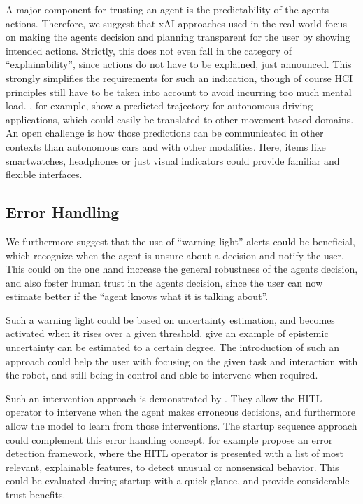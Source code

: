\documentclass[twoside,11pt]{article}
\begin{document}
A major component for trusting an agent is the predictability of the agents actions. Therefore, we suggest that xAI approaches used in the real-world focus on making the agents decision and planning transparent for the user by showing intended actions. Strictly, this does not even fall in the category of ``explainability'', since actions do not have to be explained, just announced. This strongly simplifies the requirements for such an indication, though of course HCI principles still have to be taken into account to avoid incurring too much mental load. \citet{Caltagarione:2017:DrivingPathGeneration}, for example, show a predicted trajectory for autonomous driving applications, which could easily be translated to other movement-based domains. 
An open challenge is how those predictions can be communicated in other contexts than autonomous cars and with other modalities. Here, items like smartwatches, headphones or just visual indicators could provide familiar and flexible interfaces.

\subsection{Error Handling}
We furthermore suggest that the use of ``warning light'' alerts could be beneficial, which recognize when the agent is unsure about a decision and notify the user. This could on the one hand increase the general robustness of the agents decision, and also foster human trust in the agents decision, since the user can now estimate better if the ``agent knows what it is talking about''.

Such a warning light could be based on uncertainty estimation, and becomes activated when it rises over a given threshold. \citet{JainEtAl:2021:EpistemicUncertaintyPrediction} give an example of epistemic uncertainty can be estimated to a certain degree. The introduction of such an approach could help the user with focusing on the given task and interaction with the robot, and still being in control and able to intervene when required.

Such an intervention approach is demonstrated by \citet{WuEtAl:2021:HITLDRLAutonomousDriving}. They allow the HITL operator to intervene when the agent makes erroneous decisions, and furthermore allow the model to learn from those interventions. 
The startup sequence approach could complement this error handling concept. \citet{LiuGuoMahmud:2021:HITLErrorDetectionFramework} for example propose an error detection framework, where the HITL operator is presented with a list of most relevant, explainable features, to detect unusual or nonsensical behavior. This could be evaluated during startup with a quick glance, and provide considerable trust benefits.\\
\end{document}
